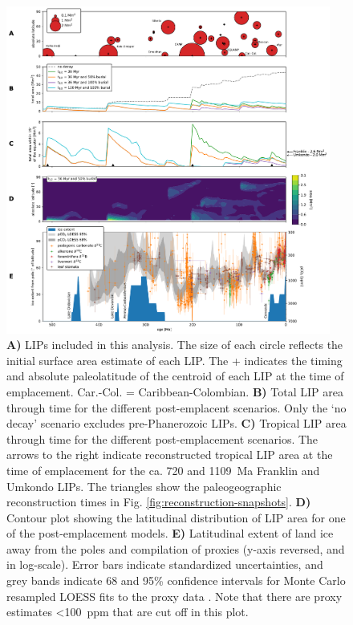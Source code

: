 \begin{figure}[!htbp]
\begin{center}
	\includegraphics[width=0.95\textwidth]{figures/LIPs/LIP-areas.pdf}
	\caption[Reconstructed large igneous province areas, ice extent, and \pCOtwo proxies for the Phanerozoic.]{\textbf{A)} LIPs included in this analysis. The size of each circle reflects the initial surface area estimate of each LIP. The + indicates the timing and absolute paleolatitude of the centroid of each LIP at the time of emplacement. Car.-Col. = Caribbean-Colombian. \textbf{B)} Total LIP area through time for the different post-emplacent scenarios. Only the `no decay' scenario excludes pre-Phanerozoic LIPs. \textbf{C)} Tropical LIP area through time for the different post-emplacement scenarios. The arrows to the right indicate reconstructed tropical LIP area at the time of emplacement for the ca. 720 and 1109~Ma Franklin and Umkondo LIPs. The triangles show the paleogeographic reconstruction times in Fig. \ref{fig:reconstruction-snapshots}. \textbf{D)} Contour plot showing the latitudinal distribution of LIP area for one of the post-emplacement models. \textbf{E)} Latitudinal extent of land ice away from the poles \citep{Macdonald2019a} and compilation of \pCOtwo proxies \citep{Foster2017a} (\pCOtwo y-axis reversed, and in log-scale). Error bars indicate standardized uncertainties, and grey bands indicate 68 and 95\% confidence intervals for Monte Carlo resampled LOESS fits to the \pCOtwo proxy data \citep{Foster2017a}. Note that there are \pCOtwo proxy estimates \textless100~ppm that are cut off in this plot.}
	\label{fig:LIP-areas}
\end{center}
\end{figure}

